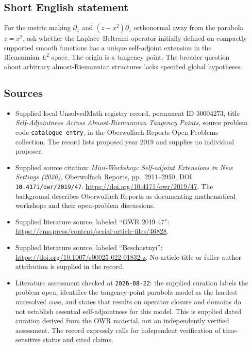\documentclass[11pt]{article}
\begin{document}
\subsection{Short English statement}
For the metric making \(\partial_x\) and \((z-x^2)\partial_z\) orthonormal away from the parabola \(z=x^2\), ask whether the Laplace--Beltrami operator initially defined on compactly supported smooth functions has a unique self-adjoint extension in the Riemannian \(L^2\) space. The origin is a tangency point. The broader question about arbitrary almost-Riemannian structures lacks specified global hypotheses.
\subsection{Sources}
\begin{itemize}
\item Supplied local UnsolvedMath registry record, permanent ID \(30004273\), title \emph{Self-Adjointness Across Almost-Riemannian Tangency Points}, source problem code \texttt{catalogue entry}, in the Oberwolfach Reports Open Problems collection. The record lists proposed year \(2019\) and supplies no individual proposer.
\item Supplied source citation: \emph{Mini-Workshop: Self-adjoint Extensions in New Settings (2020)}, Oberwolfach Reports, pp.~2911--2950, DOI \texttt{10.4171/owr/2019/47}. \url{https://doi.org/10.4171/owr/2019/47}. The background describes Oberwolfach Reports as documenting mathematical workshops and their open-problem discussions.
\item Supplied literature source, labeled ``OWR 2019 47'': \url{https://ems.press/content/serial-article-files/46828}.
\item Supplied literature source, labeled ``Beschastnyi'': \url{https://doi.org/10.1007/s00025-022-01832-z}. No article title or fuller author attribution is supplied in the record.
\item Literature assessment checked at \texttt{2026-08-22}: the supplied curation labels the problem open, identifies the tangency-point parabola model as the hardest unresolved case, and states that results on operator closure and domains do not establish essential self-adjointness for this model. This is supplied dated curation derived from the OWR material, not an independently verified assessment. The record expressly calls for independent verification of time-sensitive status and cited claims.
\end{itemize}
\end{document}
